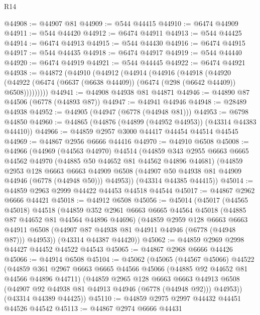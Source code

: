 \begin{lexlean}{R14}
\begin{coremodule}
@44908 := @44907 @81
@44909 := @544 @44415
@44910 := @6474 @44909
@44911 := @544 @44420
@44912 := @6474 @44911
@44913 := @544 @44425
@44914 := @6474 @44913
@44915 := @544 @44430
@44916 := @6474 @44915
@44917 := @544 @44435
@44918 := @6474 @44917
@44919 := @544 @44440
@44920 := @6474 @44919
@44921 := @544 @44445
@44922 := @6474 @44921
@44938 := @44872
    (@44910
      (@44912
        (@44914
          (@44916
            (@44918
              (@44920
                (@44922 (@6474 (@6637 (@6638 @44409)) (@6474 (@298 (@6642 @44409)) @6508)))))))))
@44941 := @44908 @44938 @81 @44871
@44946 := @44890 @87 @44506 (@6778 (@44893 @87))
@44947 := @44941 @44946
@44948 := @28489 @44938
@44952 := @44905 (@44947 (@6778 (@44948 @81)))
@44953 := @6798 @44850
@44960 := @44865 (@44876 (@44899 (@44952 @44953)) (@43314 @44383 @44410))
@44966 := @44859 @2957 @3000 @44417 @44454 @44514 @44545
@44969 := @44867 @2956 @6666 @44416
@44970 := @44910 @6508
@45008 := @44966
    (@44969
      (@44563 @44970)
      @44514
      (@44859
        @343
        @2955
        @6663
        @6665
        @44562
        @44970
        (@44885 @50 @44652 @81 @44562 @44896 @44681)
        (@44859
          @2953
          @128
          @6663
          @6663
          @44909
          @6508
          (@44907 @50 @44938 @81 @44909 @44946 (@6778 (@44948 @50)))
          @44953))
      (@43314 @44385 @44415))
@45014 := @44859 @2963 @2999 @44422 @44453 @44518 @44544
@45017 := @44867 @2962 @6666 @44421
@45018 := @44912 @6508
@45056 := @45014
    (@45017
      (@44565 @45018)
      @44518
      (@44859
        @352
        @2961
        @6663
        @6665
        @44564
        @45018
        (@44885 @87 @44652 @81 @44564 @44896 @44696)
        (@44859
          @2959
          @128
          @6663
          @6663
          @44911
          @6508
          (@44907 @87 @44938 @81 @44911 @44946 (@6778 (@44948 @87)))
          @44953))
      (@43314 @44387 @44420))
@45062 := @44859 @2969 @2998 @44427 @44452 @44522 @44543
@45065 := @44867 @2968 @6666 @44426
@45066 := @44914 @6508
@45104 := @45062
    (@45065
      (@44567 @45066)
      @44522
      (@44859
        @361
        @2967
        @6663
        @6665
        @44566
        @45066
        (@44885 @92 @44652 @81 @44566 @44896 @44711)
        (@44859
          @2965
          @128
          @6663
          @6663
          @44913
          @6508
          (@44907 @92 @44938 @81 @44913 @44946 (@6778 (@44948 @92)))
          @44953))
      (@43314 @44389 @44425))
@45110 := @44859 @2975 @2997 @44432 @44451 @44526 @44542
@45113 := @44867 @2974 @6666 @44431

\end{coremodule}
\end{lexlean}
